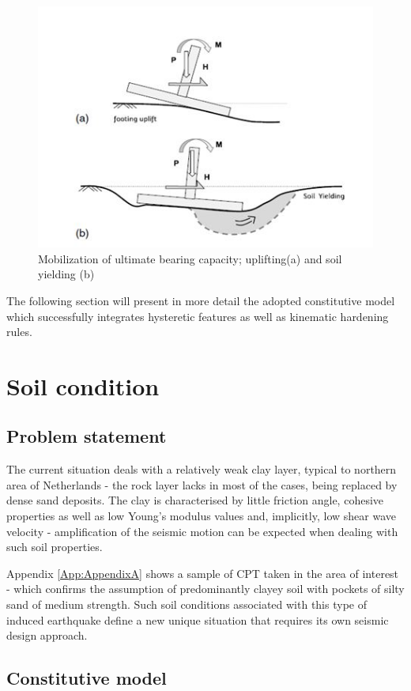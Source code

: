 \documentclass[12pt,a4paper]{report}
\begin{document}
\begin{figure}[h!]
	\centering
	\includegraphics[width=0.8\linewidth]{"uplift"}
	\caption{Mobilization of ultimate bearing capacity; uplifting(a) and soil yielding (b)}
	\label{uplift}
\end{figure}

The following section will present in more detail the adopted constitutive model which successfully integrates hysteretic features as well as kinematic hardening rules.

\newpage
\section{Soil condition}
\subsection{Problem statement}
The current situation deals with a relatively weak clay layer, typical to northern area of Netherlands - the rock layer lacks in most of the cases, being replaced by dense sand deposits. The clay is characterised by little friction angle, cohesive properties as well as low Young's modulus values and, implicitly, low shear wave velocity - amplification of the seismic motion can be expected when dealing with such soil properties.

Appendix \ref{App:AppendixA} shows a sample of CPT taken in the area of interest - which confirms the assumption of predominantly clayey soil with pockets of silty sand of medium strength. Such soil conditions associated with this type of induced earthquake define a new unique situation that requires its own seismic design approach.

\subsection{Constitutive model}
\end{document}
